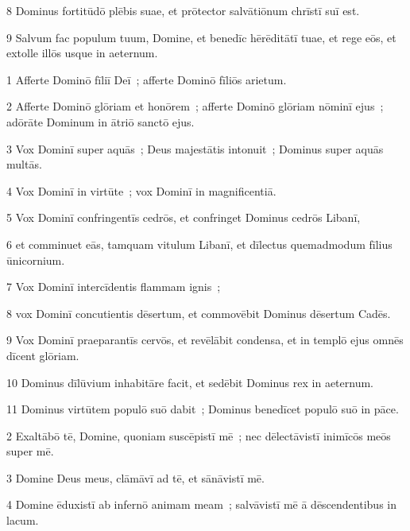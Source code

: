 \psalmVerse
  {\phantom{00}8}
  {Dominus fortitūdō plēbis suae, et prōtector salvātiōnum chrīstī suī est.}


\psalmVerse
  {\phantom{00}9}
  {Salvum fac populum tuum, Domine, et benedīc hērēditātī tuae, et rege eōs, et extolle illōs usque in aeternum.}



\psalmVerse
  {\phantom{00}1}
  {Afferte Dominō fīliī Deī~; afferte Dominō fīliōs arietum.}


\psalmVerse
  {\phantom{00}2}
  {Afferte Dominō glōriam et honōrem~; afferte Dominō glōriam nōminī ejus~; adōrāte Dominum in ātriō sanctō ejus.}


\psalmVerse
  {\phantom{00}3}
  {Vox Dominī super aquās~; Deus majestātis intonuit~; Dominus super aquās multās.}


\psalmVerse
  {\phantom{00}4}
  {Vox Dominī in virtūte~; vox Dominī in magnificentiā.}


\psalmVerse
  {\phantom{00}5}
  {Vox Dominī confringentīs cedrōs, et confringet Dominus cedrōs Libanī,}


\psalmVerse
  {\phantom{00}6}
  {et comminuet eās, tamquam vitulum Libanī, et dīlectus quemadmodum fīlius ūnicornium.}


\psalmVerse
  {\phantom{00}7}
  {Vox Dominī intercīdentis flammam ignis~;}


\psalmVerse
  {\phantom{00}8}
  {vox Dominī concutientis dēsertum, et commovēbit Dominus dēsertum Cadēs.}


\psalmVerse
  {\phantom{00}9}
  {Vox Dominī praeparantīs cervōs, et revēlābit condensa, et in templō ejus omnēs dīcent glōriam.}


\psalmVerse
  {\phantom{0}10}
  {Dominus dīlūvium inhabitāre facit, et sedēbit Dominus rex in aeternum.}


\psalmVerse
  {\phantom{0}11}
  {Dominus virtūtem populō suō dabit~; Dominus benedīcet populō suō in pāce.}



\psalmVerse
  {\phantom{00}2}
  {Exaltābō tē, Domine, quoniam suscēpistī mē~; nec dēlectāvistī inimīcōs meōs super mē.}


\psalmVerse
  {\phantom{00}3}
  {Domine Deus meus, clāmāvī ad tē, et sānāvistī mē.}


\psalmVerse
  {\phantom{00}4}
  {Domine ēduxistī ab infernō animam meam~; salvāvistī mē ā dēscendentibus in lacum.}


